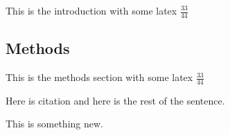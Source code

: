 \documentclass{optica-article}
\begin{document}
This is the introduction with some latex \(\frac{33}{44}\)

\hypertarget{methods}{%
\subsection{Methods}\label{methods}}

This is the methods section with some latex \(\frac{33}{44}\)

Here is citation \cite{Dolinar2011Photon} and here is the rest of the sentence.

This is something new.


\end{document}

